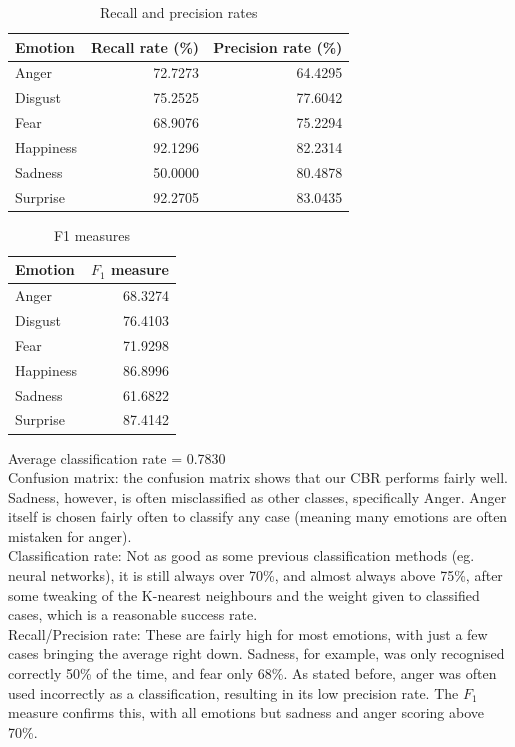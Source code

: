 \documentclass[12pt]{article}
\begin{document}
\begin{table}
\centering
\begin{tabular}{l | r r}
Emotion & Recall rate (\%) & Precision rate (\%) \\
\hline
Anger     & 72.7273 & 64.4295 \\
Disgust   & 75.2525 & 77.6042 \\
Fear      & 68.9076 & 75.2294 \\
Happiness & 92.1296 & 82.2314 \\
Sadness   & 50.0000 & 80.4878 \\
Surprise  & 92.2705 & 83.0435 \\
\end{tabular}
\caption{Recall and precision rates}
\end{table}

\begin{table}
\centering
\begin{tabular}{l | r}
Emotion & \( F_1 \) measure \\
\hline
Anger     & 68.3274 \\
Disgust   & 76.4103 \\
Fear      & 71.9298 \\
Happiness & 86.8996 \\
Sadness   & 61.6822 \\
Surprise  & 87.4142 \\
\end{tabular}
\caption{F1 measures}
\end{table}

Average classification rate = 0.7830 \\

Confusion matrix: the confusion matrix shows that our CBR performs fairly well. Sadness, however, is often misclassified as other classes, specifically Anger. Anger itself is chosen fairly often to classify any case (meaning many emotions are often mistaken for anger). \\
Classification rate: Not as good as some previous classification methods (eg. neural networks), it is still always over 70\%, and almost always above 75\%, after some tweaking of the K-nearest neighbours and the weight given to classified cases, which is a reasonable success rate. \\
Recall/Precision rate: These are fairly high for most emotions, with just a few cases bringing the average right down. Sadness, for example, was only recognised correctly 50\% of the time, and fear only 68\%. As stated before, anger was often used incorrectly as a classification, resulting in its low precision rate. The $F_1$ measure confirms this, with all emotions but sadness and anger scoring above 70\%. \\
\end{document}
